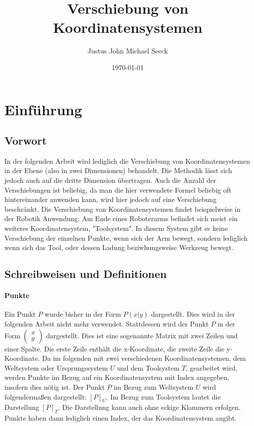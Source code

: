 \documentclass{article}
\title{Verschiebung von Koordinatensystemen}
\author{Justus John Michael Seeck}
\date{\today}
\newcommand{\m}[1]{\begin{pmatrix}#1\end{pmatrix}}
\begin{document}
    \maketitle

    \tableofcontents

    \newpage

    \section{Einführung}

    \subsection{Vorwort}

    In der folgenden Arbeit wird lediglich die Verschiebung von Koordinatensystemen in der Ebene (also in zwei Dimensionen) behandelt.
    Die Methodik lässt sich jedoch auch auf die dritte Dimension übertragen. Auch die Anzahl der Verschiebungen ist
    beliebig, da man die
    hier verwendete Formel beliebig oft hintereinander anwenden kann, wird hier jedoch auf eine Verschiebung beschränkt.
    Die Verschiebung von Koordinatensystemen findet beispielweise in der Robotik Anwendung: Am Ende eines Roboterarms
    befindet sich meist ein weiteres Koordinatensystem,
    "Toolsystem". In diesem System gibt es keine Verschiebung der einzelnen Punkte, wenn sich der Arm bewegt,
    sondern lediglich wenn sich das Tool, oder dessen Ladung beziwhungsweise Werkzeug bewegt.

    \subsection{Schreibweisen und Definitionen}
    
    \paragraph{Punkte}

    Ein Punkt $P$ wurde bisher in der Form $P(x|y)$ dargestellt. Dies wird in der folgenden Arbeit nicht mehr verwendet. Stattdessen wird
    der Punkt $P$ in der Form $\m{x \\ y}$ dargestellt. Dies ist eine sogenannte Matrix mit zwei Zeilen und einer Spalte.
    Die erste Zeile enthält die x-Koordinate, die zweite Zeile die y-Koordinate.
    Da im folgenden mit zwei verschiedenen Koordinatensystemen, dem Weltsystem oder Ursprungssystem $U$
    und dem Toolsystem $T$, gearbeitet wird,
    werden Punkte im Bezug auf ein Koordinatensystem mit Index angegeben, insofern dies nötig ist.
    Der Punkt $P$ im Bezug zum Weltsystem $U$ wird
    folgendermaßen dargestellt: ${[P]}_{U}$.
    Im Bezug zum Toolsystem lautet die Darstellung ${[P]}_{T}$.
    Die Darstellung kann auch ohne eckige Klammern erfolgen.
    Punkte haben dann lediglich einen Index, der das Koordinatensystem angibt.
    
\end{document}
